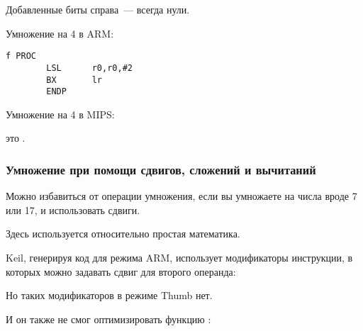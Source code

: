 Добавленные биты справа~--- всегда нули.

Умножение на 4 в ARM:

\begin{lstlisting}[caption=\NonOptimizingKeilVI (\ARMMode),style=customasmARM]
f PROC
        LSL      r0,r0,#2
        BX       lr
        ENDP
\end{lstlisting}

Умножение на 4 в MIPS:



 это .

\subsubsection{Умножение при помощи сдвигов, сложений и вычитаний}
\label{multiplication_using_shifts_adds_subs}

Можно избавиться от операции умножения, если вы умножаете на числа вроде 7 или 17,
и использовать сдвиги.

Здесь используется относительно простая математика.








Keil, генерируя код для режима ARM, использует модификаторы инструкции, в которых можно задавать
сдвиг для второго операнда:



Но таких модификаторов в режиме Thumb нет.

И он также не смог оптимизировать функцию :






